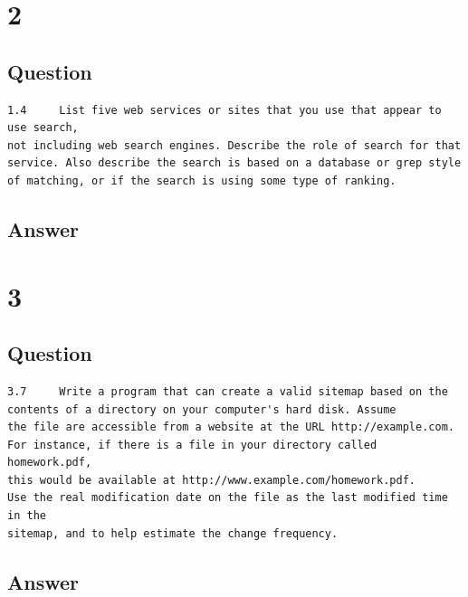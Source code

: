 \documentclass[letterpaper,11pt]{article}
\begin{document}
\clearpage


\section*{2}

\subsection*{Question}

\begin{verbatim}
1.4 	List five web services or sites that you use that appear to use search,
not including web search engines. Describe the role of search for that
service. Also describe the search is based on a database or grep style
of matching, or if the search is using some type of ranking.
\end{verbatim}

\subsection*{Answer}


\clearpage


\section*{3}

\subsection*{Question}

\begin{verbatim}
3.7 	Write a program that can create a valid sitemap based on the
contents of a directory on your computer's hard disk. Assume
the file are accessible from a website at the URL http://example.com.
For instance, if there is a file in your directory called homework.pdf,
this would be available at http://www.example.com/homework.pdf.
Use the real modification date on the file as the last modified time in the
sitemap, and to help estimate the change frequency.
\end{verbatim}

\subsection*{Answer}
\end{document}
